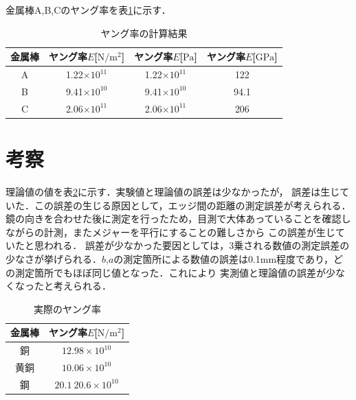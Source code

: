 \documentclass[a4paper,11pt]{ltjsarticle}
\begin{document}
金属棒A,B,Cのヤング率を表\ref{tab:youngs_modulus}に示す．
\begin{table}[htbp]
  \centering
  \caption{ヤング率の計算結果}
  \label{tab:youngs_modulus}
  \begin{tabular}{|c|c|c|c|}
    \hline
    金属棒 & ヤング率$E$[$\mathrm{N/m^2}$] & ヤング率$E$[$\mathrm{Pa}$] & ヤング率$E$[$\mathrm{GPa}$] \\ \hline
    A   & 1.22$\times 10^{11}$      & 1.22$\times 10^{11}$   & 122                     \\ \hline
    B   & 9.41$\times 10^{10}$      & 9.41$\times 10^{10}$   & 94.1                    \\ \hline
    C   & 2.06$\times 10^{11}$      & 2.06$\times 10^{11}$   & 206                     \\ \hline
  \end{tabular}
\end{table}
\section{考察}
理論値の値を表\ref{tab:youngs_modulus_true}に示す．実験値と理論値の誤差は少なかったが，
誤差は生じていた．この誤差の生じる原因として，エッジ間の距離の測定誤差が考えられる．
鏡の向きを合わせた後に測定を行ったため，目測で大体あっていることを確認しながらの計測，またメジャーを平行にすることの難しさから
この誤差が生じていたと思われる．
誤差が少なかった要因としては，3乗される数値の測定誤差の少なさが挙げられる．$b$,$a$の測定箇所による数値の誤差は0.1mm程度であり，どの測定箇所でもほぼ同じ値となった．これにより
実測値と理論値の誤差が少なくなったと考えられる．
\begin{table}[htbp]
  \centering
  \caption{実際のヤング率}
  \label{tab:youngs_modulus_true}
  \begin{tabular}{|c|c|}
    \hline
    金属棒 & ヤング率$E$[$\mathrm{N/m^2}$]   \\ \hline
    銅   & $12.98\times 10^{10}$       \\ \hline
    黄銅  & $10.06\times 10^{10}$       \\ \hline
    鋼   & $20.1 ~ 20.6\times 10^{10}$ \\ \hline
  \end{tabular}
\end{table}
\end{document}
